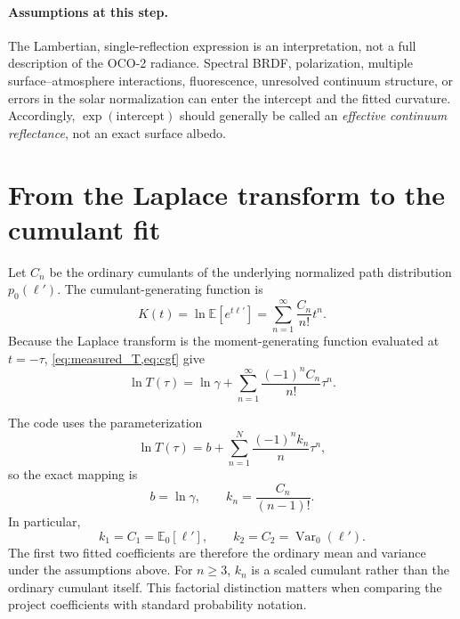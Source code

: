 \documentclass[11pt]{article}
\newcommand{\E}{\mathbb{E}}
\newcommand{\Var}{\operatorname{Var}}
\newcommand{\lp}{\ell'}
\begin{document}
\paragraph{Assumptions at this step.}
The Lambertian, single-reflection expression is an interpretation, not a full
description of the OCO-2 radiance.  Spectral BRDF, polarization, multiple
surface--atmosphere interactions, fluorescence, unresolved continuum
structure, or errors in the solar normalization can enter the intercept and
the fitted curvature.  Accordingly, $\exp(\text{intercept})$ should generally
be called an \emph{effective continuum reflectance}, not an exact surface
albedo.

\section{From the Laplace transform to the cumulant fit}

Let $C_n$ be the ordinary cumulants of the underlying normalized path
distribution $p_0(\lp)$.  The cumulant-generating function is
\begin{equation}
  K(t)=\ln\E[e^{t\lp}]
      =\sum_{n=1}^\infty \frac{C_n}{n!}t^n.
  \label{eq:cgf}
\end{equation}
Because the Laplace transform is the moment-generating function evaluated at
$t=-\tau$, \cref{eq:measured_T,eq:cgf} give
\begin{equation}
  \ln T(\tau)
  = \ln\gamma
    +\sum_{n=1}^\infty \frac{(-1)^n C_n}{n!}\tau^n.
  \label{eq:ordinary_cumulants}
\end{equation}

The code uses the parameterization
\begin{equation}
  \ln T(\tau)
  = b+\sum_{n=1}^{N}\frac{(-1)^n k_n}{n}\tau^n,
  \label{eq:project_fit}
\end{equation}
so the exact mapping is
\begin{equation}
  b=\ln\gamma,
  \qquad
  k_n=\frac{C_n}{(n-1)!}.
  \label{eq:scaled_cumulants}
\end{equation}
In particular,
\begin{equation}
  k_1=C_1=\E_0[\lp],
  \qquad
  k_2=C_2=\Var_0(\lp).
  \label{eq:first_two}
\end{equation}
The first two fitted coefficients are therefore the ordinary mean and variance
under the assumptions above.  For $n\geq3$, $k_n$ is a scaled cumulant rather
than the ordinary cumulant itself.  This factorial distinction matters when
comparing the project coefficients with standard probability notation.
\end{document}
